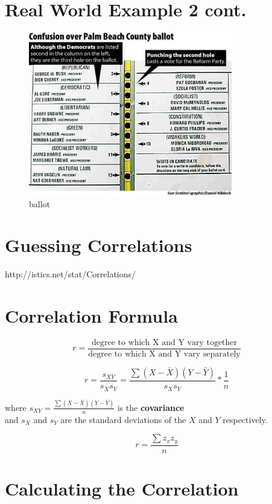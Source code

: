 \documentclass[12pt]{article}
\begin{document}
\section{Real World Example 2 cont.}\label{real-world-example-2-cont.}

\begin{figure}[H]
\centering
\includegraphics[width=3.5in]{palmballot.jpg}
\caption{ballot}
\end{figure}

\section{Guessing Correlations}\label{guessing-correlations}

http://istics.net/stat/Correlations/

\section{Correlation Formula}\label{correlation-formula}

\[ r = \frac{\mbox{degree to which X and Y vary together}}{\mbox{degree to which X and Y vary separately}} \]

\[ r = \frac{s_{XY}}{s_{X}s_{Y}} = \frac{\sum(X-\bar{X})(Y-\bar{Y})}{s_{X}s_{Y}}*\frac{1}{n} \]

where \(s_{XY} = \frac{\sum(X-\bar{X})(Y-\bar{Y})}{n}\) is the
\textbf{covariance}\\and \(s_{X}\) and \(s_{Y}\) are the standard
deviations of the \(X\) and \(Y\) respectively.

\[ r = \frac{\sum z_{x} z_{y}}{n} \]

\section{Calculating the Correlation}\label{calculating-the-correlation}
\end{document}
